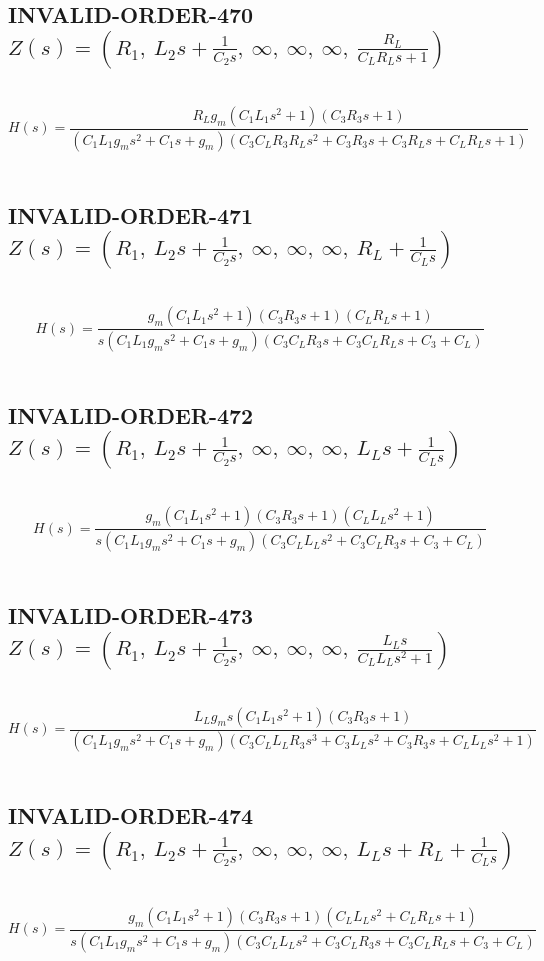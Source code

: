\documentclass{article}
\begin{document}
\subsection{INVALID-ORDER-470 $Z(s) = \left( R_{1}, \  L_{2} s + \frac{1}{C_{2} s}, \  \infty, \  \infty, \  \infty, \  \frac{R_{L}}{C_{L} R_{L} s + 1}\right)$ } \ 
\textbf{\[H(s) = \frac{R_{L} g_{m} \left(C_{1} L_{1} s^{2} + 1\right) \left(C_{3} R_{3} s + 1\right)}{\left(C_{1} L_{1} g_{m} s^{2} + C_{1} s + g_{m}\right) \left(C_{3} C_{L} R_{3} R_{L} s^{2} + C_{3} R_{3} s + C_{3} R_{L} s + C_{L} R_{L} s + 1\right)}\] } \ 
\subsection{INVALID-ORDER-471 $Z(s) = \left( R_{1}, \  L_{2} s + \frac{1}{C_{2} s}, \  \infty, \  \infty, \  \infty, \  R_{L} + \frac{1}{C_{L} s}\right)$ } \ 
\textbf{\[H(s) = \frac{g_{m} \left(C_{1} L_{1} s^{2} + 1\right) \left(C_{3} R_{3} s + 1\right) \left(C_{L} R_{L} s + 1\right)}{s \left(C_{1} L_{1} g_{m} s^{2} + C_{1} s + g_{m}\right) \left(C_{3} C_{L} R_{3} s + C_{3} C_{L} R_{L} s + C_{3} + C_{L}\right)}\] } \ 
\subsection{INVALID-ORDER-472 $Z(s) = \left( R_{1}, \  L_{2} s + \frac{1}{C_{2} s}, \  \infty, \  \infty, \  \infty, \  L_{L} s + \frac{1}{C_{L} s}\right)$ } \ 
\textbf{\[H(s) = \frac{g_{m} \left(C_{1} L_{1} s^{2} + 1\right) \left(C_{3} R_{3} s + 1\right) \left(C_{L} L_{L} s^{2} + 1\right)}{s \left(C_{1} L_{1} g_{m} s^{2} + C_{1} s + g_{m}\right) \left(C_{3} C_{L} L_{L} s^{2} + C_{3} C_{L} R_{3} s + C_{3} + C_{L}\right)}\] } \ 
\subsection{INVALID-ORDER-473 $Z(s) = \left( R_{1}, \  L_{2} s + \frac{1}{C_{2} s}, \  \infty, \  \infty, \  \infty, \  \frac{L_{L} s}{C_{L} L_{L} s^{2} + 1}\right)$ } \ 
\textbf{\[H(s) = \frac{L_{L} g_{m} s \left(C_{1} L_{1} s^{2} + 1\right) \left(C_{3} R_{3} s + 1\right)}{\left(C_{1} L_{1} g_{m} s^{2} + C_{1} s + g_{m}\right) \left(C_{3} C_{L} L_{L} R_{3} s^{3} + C_{3} L_{L} s^{2} + C_{3} R_{3} s + C_{L} L_{L} s^{2} + 1\right)}\] } \ 
\subsection{INVALID-ORDER-474 $Z(s) = \left( R_{1}, \  L_{2} s + \frac{1}{C_{2} s}, \  \infty, \  \infty, \  \infty, \  L_{L} s + R_{L} + \frac{1}{C_{L} s}\right)$ } \ 
\textbf{\[H(s) = \frac{g_{m} \left(C_{1} L_{1} s^{2} + 1\right) \left(C_{3} R_{3} s + 1\right) \left(C_{L} L_{L} s^{2} + C_{L} R_{L} s + 1\right)}{s \left(C_{1} L_{1} g_{m} s^{2} + C_{1} s + g_{m}\right) \left(C_{3} C_{L} L_{L} s^{2} + C_{3} C_{L} R_{3} s + C_{3} C_{L} R_{L} s + C_{3} + C_{L}\right)}\] } \ 
\end{document}
